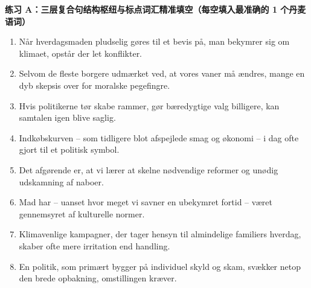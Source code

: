 \textbf{练习 A：三层复合句结构枢纽与标点词汇精准填空（每空填入最准确的 1 个丹麦语词）}
\begin{enumerate}
  \item Når hverdagsmaden pludselig gøres til et bevis på, \underline{\hspace{2.2cm}} man bekymrer sig om klimaet, opstår der let konflikter.
  \item Selvom de fleste borgere udmærket ved, at vores vaner må ændres, \underline{\hspace{2.2cm}} mange en dyb skepsis over for moralske pegefingre.
  \item Hvis politikerne tør skabe rammer, \underline{\hspace{2.2cm}} gør bæredygtige valg billigere, kan samtalen igen blive saglig.
  \item Indkøbskurven -- som tidligere blot afspejlede smag og økonomi -- \underline{\hspace{2.2cm}} i dag ofte gjort til et politisk symbol.
  \item Det afgørende er, at vi lærer at skelne \underline{\hspace{2.2cm}} nødvendige reformer og unødig udskamning af naboer.
  \item Mad har -- uanset hvor meget vi savner en ubekymret fortid -- \underline{\hspace{2.2cm}} været gennemsyret af kulturelle normer.
  \item Klimavenlige kampagner, der \underline{\hspace{2.2cm}} tager hensyn til almindelige familiers hverdag, skaber ofte mere irritation end handling.
  \item En politik, som primært bygger på individuel skyld og skam, svækker netop den brede opbakning, \underline{\hspace{2.2cm}} omstillingen kræver.
\end{enumerate}

